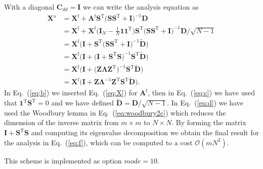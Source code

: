 \documentclass[11pt]{article}
\newcommand{\rmT}{\mathrm{T}}
\newcommand{\rmf}{\mathrm{f}}
\newcommand{\rma}{\mathrm{a}}
\newcommand{\calO}{\mathcal{O}}
\newcommand{\bmEN}{\mathbf{1}}
\newcommand{\bIenen}{\Big(\bmI_N-\frac{1}{N} \bmEN\bmEN^\rmT\Big)}
\newcommand{\bmLambda}{\boldsymbol{\Lambda}}
\newcommand{\bmA}{{\mathbf{A}}}
\newcommand{\bmC}{{\mathbf{C}}}
\newcommand{\bmD}{{\mathbf{D}}}
\newcommand{\bmI}{{\mathbf{I}}}
\newcommand{\bmS}{{\mathbf{S}}}
\newcommand{\bmX}{{\mathbf{X}}}
\newcommand{\bmZ}{{\mathbf{Z}}}
\begin{document}
With a diagonal $\bmC_{dd} = \bmI$ we can write the analysis equation as 
%
\begin{align}
\bmX^\rma  &= \bmX^\rmf  + \bmA^\rmf          \bmS^\rmT \big( \bmS \bmS^\rmT + \bmI \big)^{-1} \bmD                                 \label{eq:a}\\
           &= \bmX^\rmf  + \bmX^\rmf \bIenen  \bmS^\rmT \big( \bmS \bmS^\rmT + \bmI \big)^{-1} \bmD \big/\sqrt{N-1}                 \label{eq:b}\\
           &= \bmX^\rmf  \Big( \bmI  +        \bmS^\rmT \big( \bmS \bmS^\rmT + \bmI \big)^{-1} \widetilde{\bmD}  \Big)              \label{eq:c}\\
           &= \bmX^\rmf  \Big( \bmI  +                  \big( \bmI + \bmS^\rmT \bmS \big)^{-1} \bmS^\rmT \widetilde{\bmD}  \Big)    \label{eq:d}\\
           &= \bmX^\rmf  \Big( \bmI  +                  \big( \bmZ \bmLambda \bmZ^\rmT \big)^{-1} \bmS^\rmT \widetilde{\bmD}  \Big) \label{eq:e}\\
           &= \bmX^\rmf  \Big( \bmI  +                        \bmZ \bmLambda^{-1} \bmZ^\rmT  \bmS^\rmT \widetilde{\bmD}  \Big).     \label{eq:f}
\end{align}
%
In Eq.~(\ref{eq:b}) we inserted Eq.~(\ref{eq:X}) for $\bmA^\rmf$,
then in Eq.~(\ref{eq:c}) we have used that $\bmEN^\rmT \bmS^\rmT =0$ and we have defined $\widetilde{\bmD} = \bmD/\sqrt{N-1}$.
In Eq.~(\ref{eq:d}) we have used the Woodbury lemma in Eq.~(\ref{eq:woodbury2c}) which reduces the dimension of the inverse matrix from $m\times m$ to $N \times N$.
By forming the matrix $ \bmI + \bmS^\rmT \bmS$ and computing its eigenvalue decomposition we obtain the final result for the analysis in Eq.~(\ref{eq:f}), which can 
be computed to a cost $\calO(mN^2)$.

This scheme is implemented as option $\textit{mode}=10$.
\end{document}
